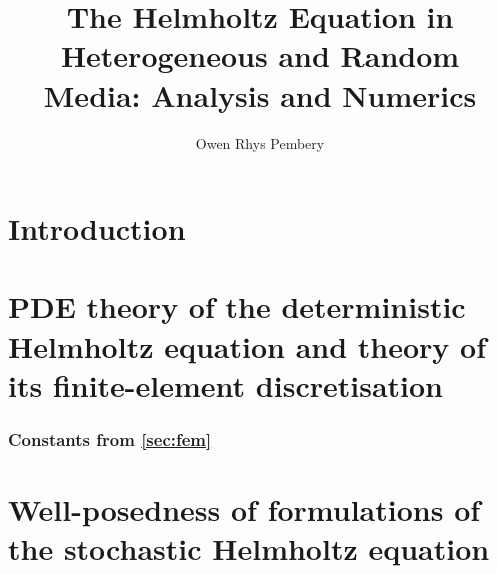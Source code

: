 \documentclass[11pt]{book}
\title{The Helmholtz Equation in Heterogeneous and Random Media: Analysis and Numerics}
\author{Owen Rhys Pembery}
\begin{document}


\maketitle

\makeaftertitle




\tableofcontents

\listoffigures
\listoftables
\listofalgorithms

\chapter{Introduction}\label{chap:intro}


\chapter{PDE theory of the deterministic Helmholtz equation and theory of its finite-element discretisation}\label{chap:background}





\subsection{Constants from \cref{sec:fem}}\label{app:constants}


%

%

\chapter{Well-posedness of formulations of the stochastic Helmholtz equation}\label{chap:stochastic}

 








\end{document}
